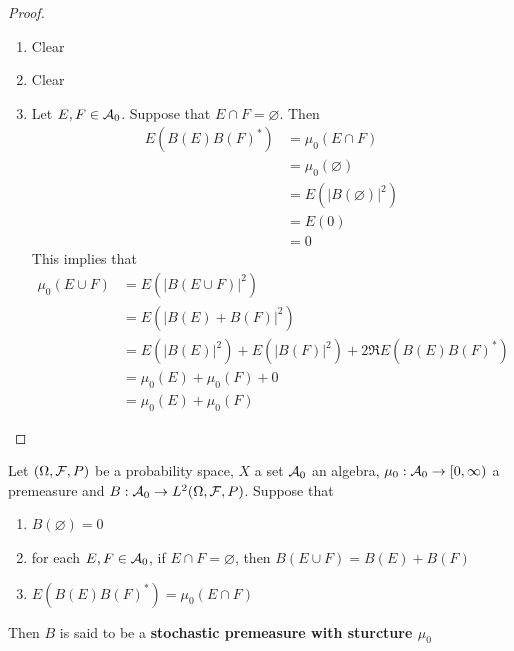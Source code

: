 \documentclass{book}
\begin{document}
	\begin{proof}\
	\begin{enumerate}
	\item Clear 
	\item Clear
	\item Let $E, F \in \mathcal{A}_0$. Suppose that $E \cap F = \varnothing$. Then 
	\begin{align*}
	E(B(E)B(F)^*) 
	&= \mu_0(E \cap F) \\
	&= \mu_0(\varnothing) \\
	&= E(|B(\varnothing)|^2) \\
	&= E(0) \\
	&= 0
	\end{align*}
	This implies that 
	\begin{align*}
	\mu_0(E \cup F) 
	&= E(|B(E \cup F)|^2) \\
	&= E(|B(E) + B(F)|^2) \\
	&= E(|B(E)|^2) + E(|B(F)|^2) + 2 \Re E(B(E)B(F)^*) \\
	&= \mu_0(E) + \mu_0(F) +0  \\
	&=  \mu_0(E) + \mu_0(F) 
	\end{align*}
	\end{enumerate}
	\end{proof}
	
	\begin{defn}
	Let $(\Omega, \mathcal{F}, P)$ be a probability space, $X$ a set $\mathcal{A}_0$ an algebra, $\mu_0:\mathcal{A}_0 \rightarrow [0,\infty)$ a premeasure and $B:\mathcal{A}_0 \rightarrow L^2(\Omega, \mathcal{F}, P)$. 
	Suppose that 
	\begin{enumerate}
	\item $B(\varnothing) = 0$
	\item for each $E, F \in \mathcal{A}_0$, if $E \cap F = \varnothing$, then $B(E \cup F) = B(E) + B(F)$
	\item $E (B(E)B(F)^*) = \mu_0(E \cap F)$
	\end{enumerate}
	Then $B$ is said to be a \textbf{stochastic premeasure with sturcture $\mu_0$}
	
	\end{defn}
	
\end{document}
